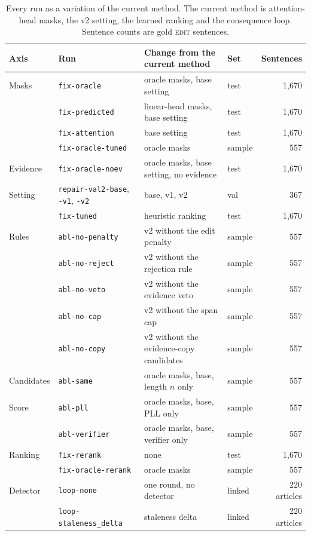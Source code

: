 \documentclass[]{paper}
\newcommand{\edit}{\textsc{edit}}
\newcommand{\run}[1]{\texttt{#1}}
\begin{document}
\begin{table}[H]
\caption{Every run as a variation of the current method. The current method is attention-head masks, the v2 setting, the learned ranking and the consequence loop. Sentence counts are gold \edit{} sentences.}
\label{tab:runs}
\centering
\footnotesize
\setlength{\tabcolsep}{4pt}
\begin{tabular}{llllr}
\toprule
Axis & Run & Change from the current method & Set & Sentences \\
\midrule
Masks & \run{fix-oracle} & oracle masks, base setting & test & 1,670 \\
 & \run{fix-predicted} & linear-head masks, base setting & test & 1,670 \\
 & \run{fix-attention} & base setting & test & 1,670 \\
 & \run{fix-oracle-tuned} & oracle masks & sample & 557 \\
Evidence & \run{fix-oracle-noev} & oracle masks, base setting, no evidence & test & 1,670 \\
Setting & \run{repair-val2-base}, \run{-v1}, \run{-v2} & base, v1, v2 & val & 367 \\
 & \run{fix-tuned} & heuristic ranking & test & 1,670 \\
Rules & \run{abl-no-penalty} & v2 without the edit penalty & sample & 557 \\
 & \run{abl-no-reject} & v2 without the rejection rule & sample & 557 \\
 & \run{abl-no-veto} & v2 without the evidence veto & sample & 557 \\
 & \run{abl-no-cap} & v2 without the span cap & sample & 557 \\
 & \run{abl-no-copy} & v2 without the evidence-copy candidates & sample & 557 \\
Candidates & \run{abl-same} & oracle masks, base, length $n$ only & sample & 557 \\
Score & \run{abl-pll} & oracle masks, base, PLL only & sample & 557 \\
 & \run{abl-verifier} & oracle masks, base, verifier only & sample & 557 \\
Ranking & \run{fix-rerank} & none & test & 1,670 \\
 & \run{fix-oracle-rerank} & oracle masks & sample & 557 \\
Detector & \run{loop-none} & one round, no detector & linked & 220 articles \\
 & \run{loop-staleness\_delta} & staleness delta & linked & 220 articles \\

\end{tabular}
\end{table}
\end{document}

